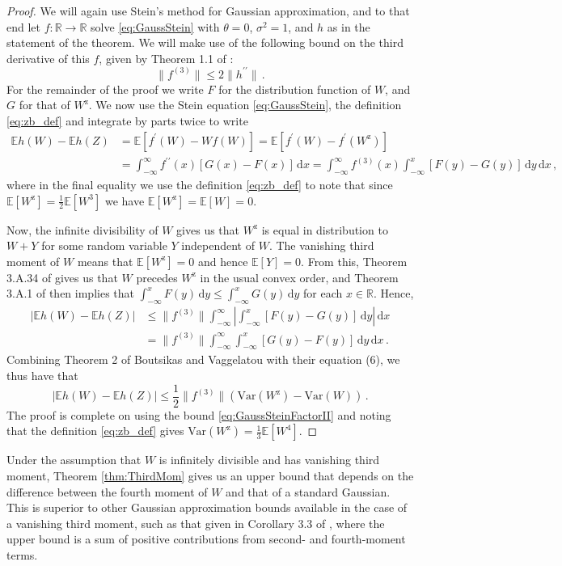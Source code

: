 \documentclass[12pt]{article}
\begin{document}
\begin{proof}
We will again use Stein's method for Gaussian approximation, and to that end let $f:\mathbb{R}\to\mathbb{R}$ solve \eqref{eq:GaussStein} with $\theta=0$, $\sigma^2=1$, and $h$ as in the statement of the theorem. We will make use of the following bound on the third derivative of this $f$, given by Theorem 1.1 of \cite{daly08}:
\begin{equation}\label{eq:GaussSteinFactorII}
\lVert f^{(3)}\rVert\leq2\lVert h^{\prime\prime}\rVert\,.
\end{equation}
For the remainder of the proof we write $F$ for the distribution function of $W$, and $G$ for that of $W^\text{z}$. We now use the Stein equation \eqref{eq:GaussStein}, the definition \eqref{eq:zb_def} and integrate by parts twice to write
\begin{align*}
\mathbb{E}h(W)-\mathbb{E}h(Z)&=\mathbb{E}[f^\prime(W)-Wf(W)]
=\mathbb{E}[f^\prime(W)-f^\prime(W^\text{z})]\\
&=\int_{-\infty}^\infty f^{\prime\prime}(x)\left[G(x)-F(x)\right]\,\text{d}x
=\int_{-\infty}^\infty f^{(3)}(x)\int_{-\infty}^x\left[F(y)-G(y)\right]\,\text{d}y\,\text{d}x\,,
\end{align*}
where in the final equality we use the definition \eqref{eq:zb_def} to note that since $\mathbb{E}[W^\text{z}]=\frac{1}{2}\mathbb{E}[W^3]$ we have $\mathbb{E}[W^\text{z}]=\mathbb{E}[W]=0$.

Now, the infinite divisibility of $W$ gives us that $W^\text{z}$ is equal in distribution to $W+Y$ for some random variable $Y$ independent of $W$. The vanishing third moment of $W$ means that $\mathbb{E}[W^\text{z}]=0$ and hence $\mathbb{E}[Y]=0$. From this, Theorem 3.A.34 of \cite{shaked07} gives us that $W$ precedes $W^\text{z}$ in the usual convex order, and Theorem 3.A.1 of \cite{shaked07} then implies that $\int_{-\infty}^xF(y)\,\text{d}y\leq\int_{-\infty}^x G(y)\,\text{d}y$ for each $x\in\mathbb{R}$. Hence,
\begin{align*}
|\mathbb{E}h(W)-\mathbb{E}h(Z)|&\leq\lVert f^{(3)}\rVert\int_{-\infty}^\infty\left|\int_{-\infty}^x[F(y)-G(y)]\,\text{d}y\right|\,\text{d}x\\
&=\lVert f^{(3)}\rVert\int_{-\infty}^\infty\int_{-\infty}^x[G(y)-F(y)]\,\text{d}y\,\text{d}x\,.
\end{align*}
Combining Theorem 2 of Boutsikas and Vaggelatou \cite{boutsikas02} with their equation (6), we thus have that 
\[
|\mathbb{E}h(W)-\mathbb{E}h(Z)|\leq\frac{1}{2}\lVert f^{(3)}\rVert\left(\text{Var}(W^\text{z})-\text{Var}(W)\right)\,.
\]
The proof is complete on using the bound \eqref{eq:GaussSteinFactorII} and noting that the definition \eqref{eq:zb_def} gives $\text{Var}(W^\text{z})=\frac{1}{3}\mathbb{E}[W^4]$.
\end{proof}
Under the assumption that $W$ is infinitely divisible and has vanishing third moment, Theorem \ref{thm:ThirdMom} gives us an upper bound that depends on the difference between the fourth moment of $W$ and that of a standard Gaussian. This is superior to other Gaussian approximation bounds available in the case of a vanishing third moment, such as that given in Corollary 3.3 of \cite{gaunt16}, where the upper bound is a sum of positive contributions from second- and fourth-moment terms.
\end{document}
